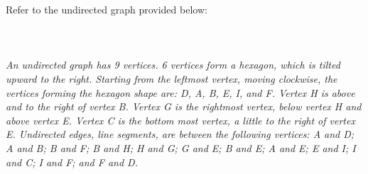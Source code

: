 \documentclass{amsart}
\theoremstyle{definition}
\theoremstyle{Exercise}
\theoremstyle{remark}
\theoremstyle{rule}
\numberwithin{equation}{section}
\begin{document}
Refer to the undirected graph provided below:
\\\\
  \\\\
{\color{blue}{\bf Figure 6:} \emph{An undirected graph has 9 vertices. 6 vertices form a hexagon, which is tilted upward to the right. Starting from the leftmost vertex, moving clockwise, the vertices forming the hexagon shape are: D, A, B, E, I, and F. Vertex H is above and to the right of vertex B. Vertex G is the rightmost vertex, below vertex H and above vertex E. Vertex C is the bottom most vertex, a little to the right of vertex E. Undirected edges, line segments, are between the following vertices: A and D; A and B; B and F; B and H; H and G; G and E; B and E; A and E; E and I; I and C; I and F; and F and D.
}
}
\\
\\
\end{document}

